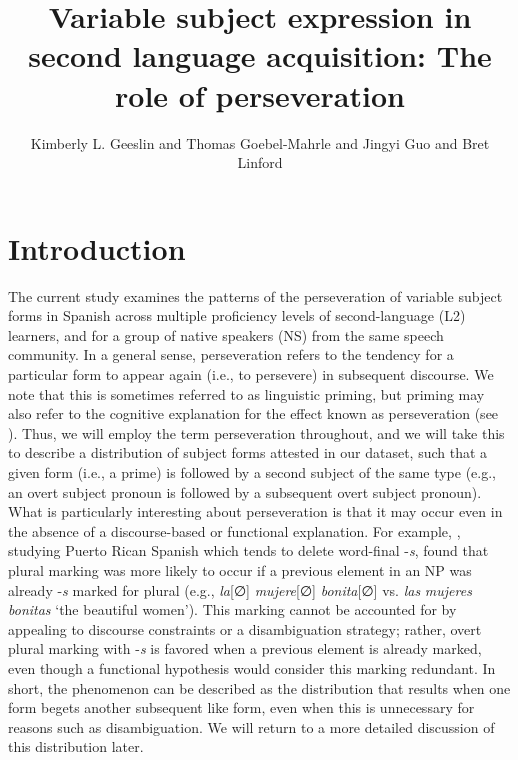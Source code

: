 \documentclass[output=paper]{langscibook}
\author{Kimberly L. Geeslin\orcid{}\affiliation{Indiana University} and Thomas Goebel-Mahrle\orcid{}\affiliation{Indiana University} and Jingyi Guo\orcid{}\affiliation{Indiana University} and Bret Linford\orcid{}\affiliation{Grand Valley State University}}
\title [Variable subject expression in second language acquisition] {Variable subject expression in second language acquisition: The role of perseveration}
\begin{document}
\AffiliationsWithIndexing{}
\maketitle

\section{Introduction}\label{sec:geeslin:1}
The current study examines the patterns of the perseveration of variable subject forms in Spanish across multiple proficiency levels of second-language (L2) learners, and for a group of native speakers (NS) from the same speech community. In a general sense, perseveration refers to the tendency for a particular form to appear again (i.e., to persevere) in subsequent discourse. We note that this is sometimes referred to as linguistic priming, but priming may also refer to the cognitive explanation for the effect known as perseveration (see \citealt{Otheguy2015}). Thus, we will employ the term perseveration throughout, and we will take this to describe a distribution of subject forms attested in our dataset, such that a given form (i.e., a prime) is followed by a second subject of the same type (e.g., an overt subject pronoun is followed by a subsequent overt subject pronoun). What is particularly interesting about perseveration is that it may occur even in the absence of a discourse-based or functional explanation. For example, \citet{Poplack1980}, studying Puerto Rican Spanish which tends to delete word-final -\textit{s}, found that plural marking was more likely to occur if a previous element in an NP was already -\textit{s} marked for plural (e.g., \textit{la}{[∅]} \textit{mujere}{[∅]} \textit{bonita}{[∅] vs.} \textit{la}\textit{s} \textit{mujere}\textit{s} \textit{bonita}\textit{s} ‘the beautiful women’). This marking cannot be accounted for by appealing to discourse constraints or a disambiguation strategy; rather, overt plural marking with -\textit{s} is favored when a previous element is already marked, even though a functional hypothesis would consider this marking redundant. In short, the phenomenon can be described as the distribution that results when one form begets another subsequent like form, even when this is unnecessary for reasons such as disambiguation. We will return to a more detailed discussion of this distribution later.
\end{document}
